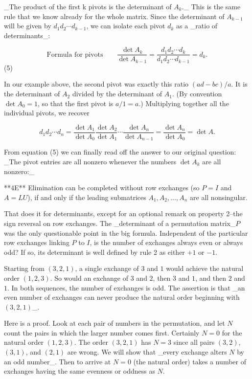 _The product of the first k pivots is the determinant of \(A_{k}\)._ This is the same rule that we know already for the whole matrix. Since the determinant of \(A_{k-1}\) will be given by \(d_{1}d_{2}\cdots d_{k-1}\), we can isolate each pivot \(d_{k}\) as a _ratio of determinants_:

\[\text{{Formula for pivots}}\qquad\frac{\det A_{k}}{\det A_{k-1}}=\frac{d_{1}d_{ 2}\cdots d_{k}}{d_{1}d_{2}\cdots d_{k-1}}=d_{k}.\] (5)

In our example above, the second pivot was exactly this ratio \((ad-bc)/a\). It is the determinant of \(A_{2}\) divided by the determinant of \(A_{1}\). (By convention \(\det A_{0}=1\), so that the first pivot is \(a/1=a\).) Multiplying together all the individual pivots, we recover

\[d_{1}d_{2}\cdots d_{n}=\frac{\det A_{1}}{\det A_{0}}\frac{\det A_{2}}{\det A_ {1}}\cdots\frac{\det A_{n}}{\det A_{n-1}}=\frac{\det A_{n}}{\det A_{0}}=\det A.\]

From equation (5) we can finally read off the answer to our original question: _The pivot entries are all nonzero whenever the numbers \(\det A_{k}\) are all nonzero:_

**4E** Elimination can be completed without row exchanges (so \(P=I\) and \(A=LU\)), if and only if the leading submatrices \(A_{1},A_{2},\ldots,A_{n}\) are all nonsingular.

That does it for determinants, except for an optional remark on property 2--the sign reversal on row exchanges. The _determinant of a permutation matrix_\(P\) was the only questionable point in the big formula. Independent of the particular row exchanges linking \(P\) to \(I\), is the number of exchanges always even or always odd? If so, its determinant is well defined by rule 2 as either \(+1\) or \(-1\).

Starting from \((3,2,1)\), a single exchange of \(3\) and \(1\) would achieve the natural order \((1,2,3)\). So would an exchange of \(3\) and \(2\), then \(3\) and \(1\), and then \(2\) and \(1\). In both sequences, the number of exchanges is odd. The assertion is that _an even number of exchanges can never produce the natural order beginning with \((3,2,1)\)_.

Here is a proof. Look at each pair of numbers in the permutation, and let \(N\) count the pairs in which the larger number comes first. Certainly \(N=0\) for the natural order \((1,2,3)\). The order \((3,2,1)\) has \(N=3\) since all pairs \((3,2)\), \((3,1)\), and \((2,1)\) are wrong. We will show that _every exchange alters \(N\) by an odd number_. Then to arrive at \(N=0\) (the natural order) takes a number of exchanges having the same evenness or oddness as \(N\).

